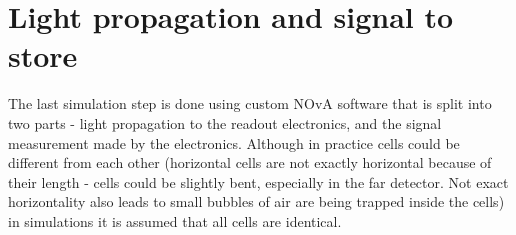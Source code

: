 
\section{Light propagation and signal to store}
The last simulation step is done using custom NOvA software that is split into two parts - light
propagation to the readout electronics, and the signal measurement made by the electronics. Although in practice cells could 
be different from each other (horizontal cells are not exactly horizontal because of their length - cells could be
slightly bent, especially in the far detector. Not exact horizontality also leads to small bubbles of air are
being trapped inside the cells) in simulations it is assumed that all cells are identical.

